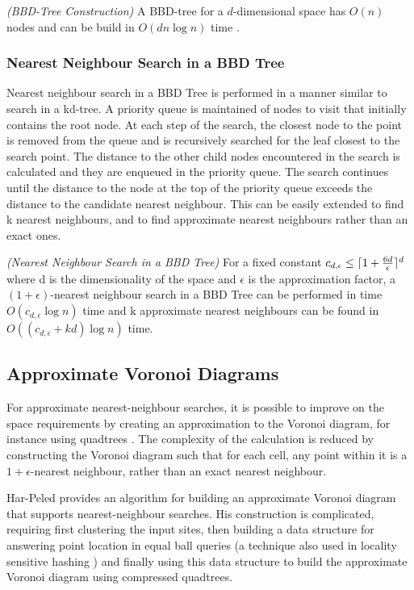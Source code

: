 \documentclass[mcs]{scsthesis}
\begin{document}
\begin{thm} \emph{(BBD-Tree Construction)} 
A BBD-tree for a \(d\)-dimensional space has \(O(n)\) nodes and can be build in
\(O(d n \log n)\) time \cite{optimalann}.
\end{thm}

\subsubsection{Nearest Neighbour Search in a BBD Tree}

Nearest neighbour search in a BBD Tree is performed in a manner similar to
search in a kd-tree. A priority queue is maintained of nodes to visit that 
initially contains the root node. At each step of the search, the closest
node to the point is removed from the queue and is recursively searched for
the leaf closest to the search point. The distance to the other child nodes
encountered in the search is calculated and they are enqueued in the priority
queue. The search continues until the distance to the node at the top of the
priority queue exceeds the distance to the candidate nearest neighbour. This
can be easily extended to find k nearest neighbours, and to find approximate
nearest neighbours rather than an exact ones.

\begin{thm} \emph{(Nearest Neighbour Search in a BBD Tree)} 
For a fixed constant \(c_{d,\epsilon} \le \lceil 1 + {6d \over \epsilon} \rceil^d\)
where d is the dimensionality of the space and \(\epsilon\) is the approximation
factor, a \((1 + \epsilon)\)-nearest neighbour search in a BBD Tree can be
performed in time \(O(c_{d,\epsilon} \log n)\) time and k approximate nearest
neighbours can be found in \(O((c_{d,\epsilon} + kd) \log n)\) time.
\end{thm}

\subsection{Approximate Voronoi Diagrams}

For approximate nearest-neighbour searches, it is possible to improve on the
space requirements by creating an approximation to the Voronoi diagram, for
instance using quadtrees \cite{avd}. The complexity of the calculation is
reduced by constructing the Voronoi diagram such that for each cell, any point
within it is a \(1 + \epsilon\)-nearest neighbour, rather than an exact
nearest neighbour.

Har-Peled \cite{avd} provides an algorithm for building an approximate
Voronoi diagram that supports nearest-neighbour searches. His construction is
complicated, requiring first clustering the input sites, then
building a data structure for answering point location in equal ball queries
(a technique also used in locality sensitive hashing \cite{lsh}) and finally
using this data structure to build the approximate Voronoi diagram using
compressed quadtrees.
\end{document}
